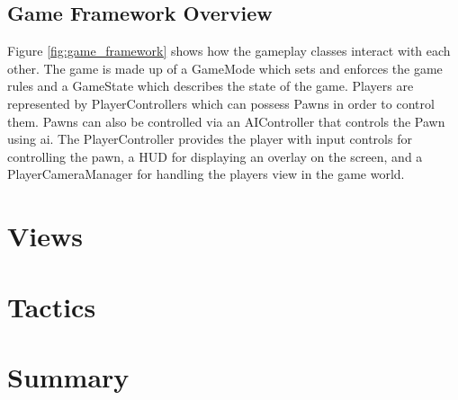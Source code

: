 \subsection{Game Framework Overview}
Figure \ref{fig:game_framework} shows how the gameplay classes interact with each other. The game is made up of a GameMode which sets and enforces the game rules and a GameState which describes the state of the game. Players are represented by PlayerControllers which can possess Pawns in order to control them. Pawns can also be controlled via an AIController that controls the Pawn using \gls{ai}. The PlayerController provides the player with input controls for controlling the pawn, a HUD for displaying an overlay on the screen, and a PlayerCameraManager for handling the players view in the game world.

\section{Views}

\section{Tactics}

\section{Summary}
